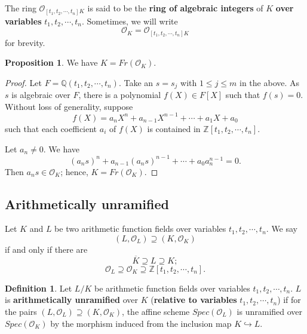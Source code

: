 \documentclass{amsart}
\theoremstyle{definition}
\newtheorem{definition}[theorem]{Definition}
\newtheorem{proposition}[theorem]{Proposition}
\numberwithin{equation}{section}
\begin{document}
The ring $\mathcal{O}_{[t_{1},t_{2},\cdots, t_{n}]K}$ is said to be the
\textbf{ring of algebraic integers} of $K$ \textbf{over variables} $t_{1},t_{2},\cdots, t_{n}$. Sometimes, we will write $$\mathcal{O}_{K}=
\mathcal{O}_{[t_{1},t_{2},\cdots, t_{n}]K}$$ for brevity.

\begin{proposition}
We have $K=Fr(\mathcal{O}_{K})$.
\end{proposition}

\begin{proof}
Let $F=\mathbb{Q}(t_{1},t_{2},\cdots, t_{n})$. Take an $s=s_{j}$ with $1\leq
j\leq m$ in the above. As $s$ is algebraic over $F$, there is a polynomial $f(X)\in F[X]$ such that $f(s)=0$. Without loss of generality, suppose
\begin{equation*}
f(X)=a_{n}X^{n}+a_{n-1}X^{n-1}+\cdots+a_{1}X+a_{0}
\end{equation*}
such that each coefficient $a_{i}$ of $f(X)$ is contained in $\mathbb{Z}[t_{1},t_{2},\cdots, t_{n}]$.

Let $a_{n}\not=0$. We have
\begin{equation*}
(a_{n}s)^{n}+a_{n-1}(a_{n}s)^{n-1}+\cdots+a_{0}a_{n}^{n-1}=0.
\end{equation*}
Then $a_{n}s\in \mathcal{O}_{K}$; hence, $K=Fr(\mathcal{O}_{K})$.
\end{proof}

\subsection{Arithmetically unramified}

Let  $K$ and $L$ be two arithmetic function fields over variables $t_{1},t_{2},\cdots, t_{n}$. We say
\begin{equation*}
(L,\mathcal{O}_{L})\supseteq (K,\mathcal{O}_{K})
\end{equation*}
if and only if there are
\begin{equation*}
\overline{K}\supseteq L\supseteq K;
\end{equation*}
\begin{equation*}
\mathcal{O}_{L}\supseteq \mathcal{O}_{K}\supseteq \mathbb{Z}
[t_{1},t_{2},\cdots, t_{n}].
\end{equation*}

\begin{definition}
Let $L/ K$ be arithmetic function fields over variables $t_{1},t_{2},\cdots,
t_{n}$. $L$ is  \textbf{arithmetically unramified} over $K$ (\textbf{relative to variables} $t_{1},t_{2},\cdots, t_{n}$) if for the pairs $(L,\mathcal{O}_{L})\supseteq (K, \mathcal{O}_{K})$, the affine scheme $Spec(\mathcal{O}_{L})$ is unramified over $Spec(\mathcal{O}_{K})$ by the morphism
induced from the inclusion map $K\hookrightarrow L $.
\end{definition}
\end{document}
